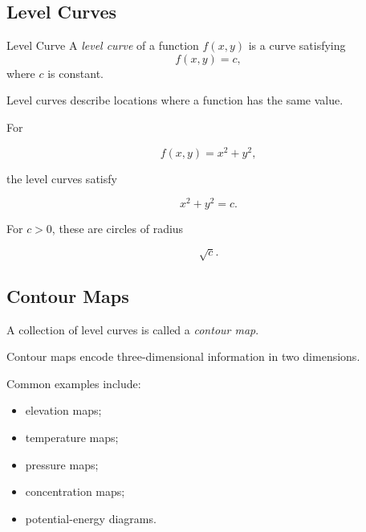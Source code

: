 \subsection{Level Curves}
\label{subsec:level-curves}

\begin{definitionbox}{Level Curve}
A \emph{level curve} of a function \(f(x,y)\) is a curve satisfying
\[ f(x,y)=c, \]
where \(c\) is constant.
\end{definitionbox}

Level curves describe locations where a function has the same value.

For

\[ f(x,y)=x^2+y^2, \]

the level curves satisfy

\[ x^2+y^2=c. \]

For \(c>0\), these are circles of radius

\[ \sqrt c. \]

\begin{center}
\end{center}

\subsection{Contour Maps}
\label{subsec:contour-maps}

A collection of level curves is called a \emph{contour map}.

Contour maps encode three-dimensional information in two dimensions.

Common examples include:

\begin{itemize}
    \item elevation maps;
    \item temperature maps;
    \item pressure maps;
    \item concentration maps;
    \item potential-energy diagrams.
\end{itemize}


